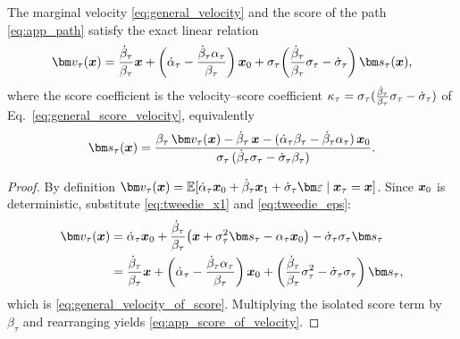 \begin{proposition}\label{prop:score_velocity}
The marginal velocity \eqref{eq:general_velocity} and the score of the path \eqref{eq:app_path} satisfy the exact linear relation
\begin{align}\label{eq:general_velocity_of_score}
    \fmvel_\tau(\bx)
    = \frac{\dot\beta_\tau}{\beta_\tau}\bx
    + \left(\dot\alpha_\tau - \frac{\dot\beta_\tau\alpha_\tau}{\beta_\tau}\right)\bx_0
    + \sigpath_\tau\!\left(\frac{\dot\beta_\tau}{\beta_\tau}\sigpath_\tau - \dot\sigpath_\tau\right)\genscore_\tau(\bx),
\end{align}
where the score coefficient is the velocity--score coefficient $\kappa_\tau=\sigma_\tau(\tfrac{\dot\beta_\tau}{\beta_\tau}\sigma_\tau-\dot{\sigma}_\tau)$ of Eq.~\eqref{eq:general_score_velocity}, equivalently
\begin{align}\label{eq:app_score_of_velocity}
    \genscore_\tau(\bx)
    = \frac{\beta_\tau\,\fmvel_\tau(\bx) - \dot\beta_\tau\,\bx - (\dot\alpha_\tau\beta_\tau - \dot\beta_\tau\alpha_\tau)\,\bx_0}
           {\sigpath_\tau\,(\dot\beta_\tau\sigpath_\tau - \dot\sigpath_\tau\beta_\tau)} .
\end{align}
\end{proposition}
\begin{proof}
By definition $\fmvel_\tau(\bx)=\E[\dot\alpha_\tau\bx_0 + \dot\beta_\tau\bx_1 + \dot\sigpath_\tau\latentnoise\mid\bx_\tau=\bx]$. Since $\boldsymbol{x}_0$ is deterministic, substitute \eqref{eq:tweedie_x1} and \eqref{eq:tweedie_eps}:
\begin{align}
    \fmvel_\tau(\bx)
    &= \dot\alpha_\tau\bx_0
    + \frac{\dot\beta_\tau}{\beta_\tau}\!\left(\bx + \sigpath_\tau^2\genscore_\tau - \alpha_\tau\bx_0\right)
    - \dot\sigpath_\tau\sigpath_\tau\genscore_\tau \nonumber\\
    &= \frac{\dot\beta_\tau}{\beta_\tau}\bx
    + \left(\dot\alpha_\tau - \frac{\dot\beta_\tau\alpha_\tau}{\beta_\tau}\right)\bx_0
    + \left(\frac{\dot\beta_\tau}{\beta_\tau}\sigpath_\tau^2 - \dot\sigpath_\tau\sigpath_\tau\right)\genscore_\tau,
\end{align}
which is \eqref{eq:general_velocity_of_score}. Multiplying the isolated score term by $\beta_\tau$ and rearranging yields \eqref{eq:app_score_of_velocity}.
\end{proof}

